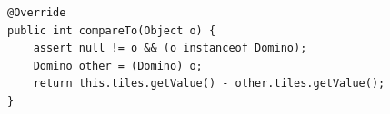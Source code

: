 \begin{lstlisting}[float,style=CodeHighlighting,caption=Domino - compareTo,label=lst:domino_compareTo]
@Override
public int compareTo(Object o) {
    assert null != o && (o instanceof Domino);
    Domino other = (Domino) o;
    return this.tiles.getValue() - other.tiles.getValue();
}
\end{lstlisting}